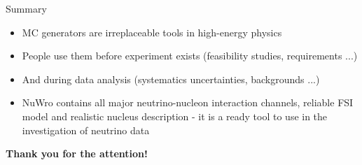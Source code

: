 \documentclass[
size=10pt,
paper=screen,
mode=present,
display=slidesnotes,
style=uwr,
nohandoutpagebreaks,
fleqn,
clock,
]{powerdot}
\begin{document}
\begin{slide}{Summary}
\null\vfill

  \begin{itemize}
  
    \item MC generators are irreplaceable tools in high-energy physics
    
    \item People use them before experiment exists (feasibility studies, requirements ...)
    
    \item And during data analysis (systematics uncertainties, backgrounds ...)    
      
    \item NuWro contains all major neutrino-nucleon interaction channels, reliable FSI model and realistic nucleus description - it is a ready tool to use in the investigation of neutrino data
  
  \end{itemize}
  
\vfill\null
\end{slide}

\begin{sectionwideslide}{}
\vspace{70pt}
{\Large\bf Thank you for the attention!}
\end{sectionwideslide}


\end{document}
